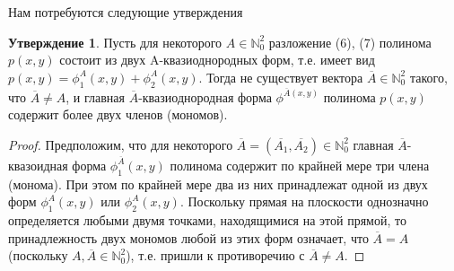 \documentclass[11pt,reqno]{amsart}
\theoremstyle{plain}
\theoremstyle{definition}
\newtheorem{statement}{Утверждение}
\begin{document}
Нам потребуются следующие утверждения
\begin{statement}\label{nef:stt:9}
Пусть для некоторого $A \in \mathbb{N}^2_0$ разложение (6), (7) полинома $p(x,y)$ состоит из двух A-квазиоднородных форм, т.е. имеет вид $p(x,y) = \phi^A_1(x,y)+\phi^A_2(x,y)$. Тогда не существует вектора $\overline{A} \in \mathbb{N}^2_0$ такого, что $\overline{A} \ne A$, и главная $\overline{A}$-квазиоднородная
форма $\phi^{\overline{A}(x,y)}$ полинома $p(x,y)$ содержит более двух членов (мономов).
\end{statement}
\noindent \begin{proof}
Предположим, что для некоторого $\overline{A}=(\overline{A_1},\overline{A_2}) \in \mathbb{N}^2_0$ главная $\overline{A}$- квазоидная форма $\phi^{\overline{A}}_1(x,y)$ полинома содержит по крайней мере три члена (монома). При этом по крайней мере два из них принадлежат одной из двух форм $\phi^{A}_1(x,y)$ или $\phi^{A}_2(x,y)$. Поскольку прямая на плоскости однозначно определяется любыми двумя
точками, находящимися на этой прямой, то принадлежность двух мономов любой из этих
форм означает, что $\overline{A} = A$ (поскольку $A,\overline{A}\in \mathbb{N}^2_0$), т.е. пришли к противоречию с $\overline{A} \ne A$.
\end{proof}
\end{document}
